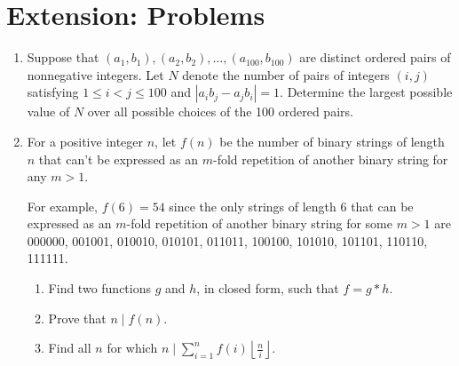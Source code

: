 \documentclass{article}
\begin{document}
\section{Extension: Problems}
\begin{enumerate}
  \item Suppose that $(a_1,b_1),(a_2,b_2),\ldots,(a_{100},b_{100})$ are distinct
    ordered pairs of nonnegative integers.
    Let $N$ denote the number of pairs of integers $(i,j)$ satisfying
    $1\leq i<j\leq 100$ and $|a_i b_j-a_j b_i|=1$. 
    Determine the largest possible value of $N$ over all possible choices of the
    100 ordered pairs.
  \item For a positive integer $n$, let $f(n)$ be the number of binary strings of length $n$ that
      can't be expressed as an $m$-fold repetition of another binary string for
      any $m>1$.

      For example, $f(6)=54$ since the only strings of length 6 that can be
      expressed as an $m$-fold repetition of another binary string for some $m>1$
      are 000000, 001001, 010010, 010101, 011011, 100100, 101010, 101101, 110110,
      111111.
       
      \begin{enumerate}
        \item Find two functions $g$ and $h$, in closed form, such that $f=g*h$.
        \item 
          Prove that $n\mid f(n)$.
        \item Find all $n$ for which $n\mid\displaystyle\sum_{i=1}^n f(i)\left\lfloor\frac
              ni\right\rfloor$.
      \end{enumerate}
\end{enumerate}
\end{document}
